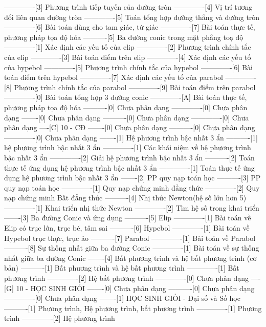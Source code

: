 -------------[3] Phương trình tiếp tuyến của đường tròn
-------------[4] Vị trí tương đối liên quan đường tròn
-------------[5] Toán tổng hợp đường thẳng và đường tròn
-------------[6] Bài toán dùng cho tam giác, tứ giác
-------------[7] Bài toán thực tế, phương pháp tọa độ hóa
----------[5] Ba đường conic trong mặt phẳng toạ độ
-------------[1] Xác định các yếu tố của elip
-------------[2] Phương trình chính tắc của elip
-------------[3] Bài toán điểm trên elip
-------------[4] Xác định các yếu tố của hypebol
-------------[5] Phương trình chính tắc của hypebol
-------------[6] Bài toán điểm trên hypebol
-------------[7] Xác định các yếu tố của parabol
-------------[8] Phương trình chính tắc của parabol
-------------[9] Bài toán điểm trên parabol
-------------[0] Bài toán tổng hợp 3 đường conic
-------------[A] Bài toán thực tế, phương pháp tọa độ hóa
----------[0] Chưa phân dạng
-------------[0] Chưa phân dạng
-------[0] Chưa phân dạng
----------[0] Chưa phân dạng
-------------[0] Chưa phân dạng
----[C] 10 - CĐ
-------[0] Chưa phân dạng
----------[0] Chưa phân dạng
-------------[0] Chưa phân dạng
-------[1] Hệ phương trình bậc nhất 3 ẩn
----------[1] hệ phương trình bậc nhất 3 ẩn
-------------[1] Các khái niệm về hệ phương trình bậc nhất 3 ẩn
-------------[2] Giải hệ phương trình bậc nhất 3 ẩn
----------[2] Toán thực tế ứng dụng hệ phương trình bậc nhất 3 ẩn
-------------[1] Toán thực tế ứng dụng hệ phương trình bậc nhất 3 ẩn
-------[2] PP quy nạp toán học
----------[3] PP quy nạp toán học
-------------[1] Quy nạp chứng minh đẳng thức
-------------[2] Quy nạp chứng minh Bất đẳng thức
----------[4] Nhị thức Newton(hệ số lớn hơn 5)
-------------[1] Khai triển nhị thức Newton
-------------[2] Tìm hệ số trong khai triển
-------[3] Ba đường Conic và ứng dụng
----------[5] Elip
-------------[1] Bài toán về Elip có trục lớn, trục bé, tâm sai
----------[6] Hypebol
-------------[1] Bài toán về Hypebol trục thực, trục ảo
----------[7] Parabol
-------------[1] Bài toán về Parabol
----------[8] Sự thống nhất giữa ba đường Conic
-------------[1] Bài toán về sự thống nhất giữa ba đường Conic
-------[4] Bất phương trình và hệ bất phương trình (cơ bản)
----------[1] Bất phương trình và hệ bất phương trình
-------------[1] Bất phương trình
-------------[2] Hệ bất phương trình
-------------[0] Chưa phân dạng
----[G] 10 - HỌC SINH GIỎI
-------[0] Chưa phân dạng
----------[0] Chưa phân dạng
-------------[0] Chưa phân dạng
-------[1] HỌC SINH GIỎI - Đại số và Số học 
----------[1] Phương trình, Hệ phương trình, bất phương trình
-------------[1] Phương trình 
-------------[2] Hệ phương trình 
